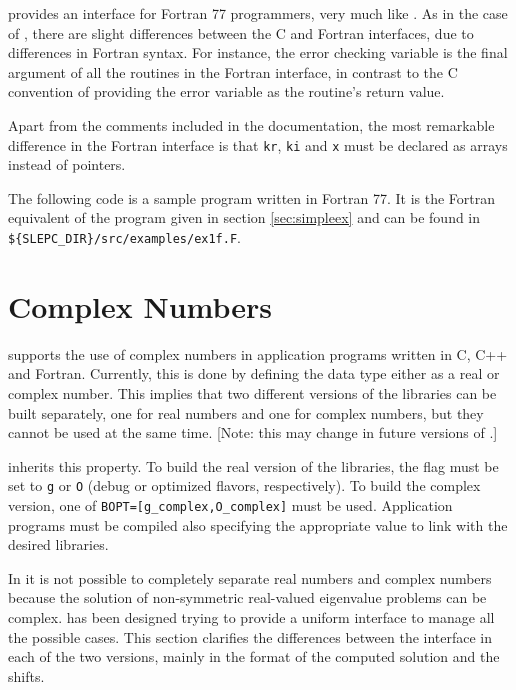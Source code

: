 	\slepc provides an interface for Fortran 77 programmers, very much like \petsc. As in the case of \petsc, there are slight differences between the C and Fortran \slepc interfaces, due to differences in Fortran syntax. For instance, the error checking variable is the final argument of all the routines in the Fortran interface, in contrast to the C convention of providing the error variable as the routine's return value.

	Apart from the comments included in the \petsc{} documentation, the most remarkable difference in the Fortran interface is that \texttt{kr}, \texttt{ki} and \texttt{x} must be declared as arrays instead of pointers. 

	The following code is a sample program written in Fortran 77. It is the Fortran equivalent of the program given in section \ref{sec:simpleex} and can be found in \Verb!${SLEPC_DIR}/src/examples/ex1f.F!.

\section{Complex Numbers}
\label{sec:complex}

	\petsc{} supports the use of complex numbers in application programs written in C, C++ and Fortran. Currently, this is done by defining the data type  either as a real or complex number. This implies that two different versions of the \petsc{} libraries can be built separately, one for real numbers and one for complex numbers, but they cannot be used at the same time. [Note: this may change in future versions of \petsc.]

	\slepc inherits this property. To build the real version of the \slepc libraries, the flag  must be set to \Verb!g! or \Verb!O! (debug or optimized flavors, respectively). To build the complex version, one of \Verb!BOPT=[g_complex,O_complex]! must be used. Application programs must be compiled also specifying the appropriate  value to link with the desired libraries.

	In \slepc it is not possible to completely separate real numbers and complex numbers because the solution of non-symmetric real-valued eigenvalue problems can be complex. \slepc has been designed trying to provide a uniform interface to manage all the possible cases. This section clarifies the differences between the interface in each of the two versions, mainly in the format of the computed solution and the shifts.

